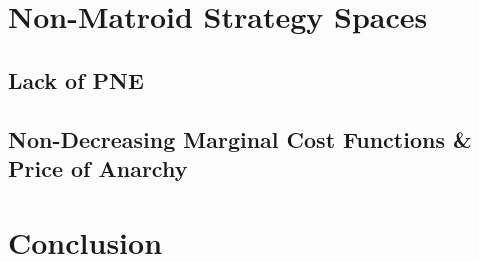 \documentclass{beamer}
\begin{document}
\section{Non-Matroid Strategy Spaces}
\subsection{Lack of PNE}
\begin{frame}
\end{frame}

\subsection{Non-Decreasing Marginal Cost Functions \& Price of Anarchy}
\begin{frame}
\end{frame}

\section{Conclusion}
\begin{frame}
\end{frame}
\end{document}
